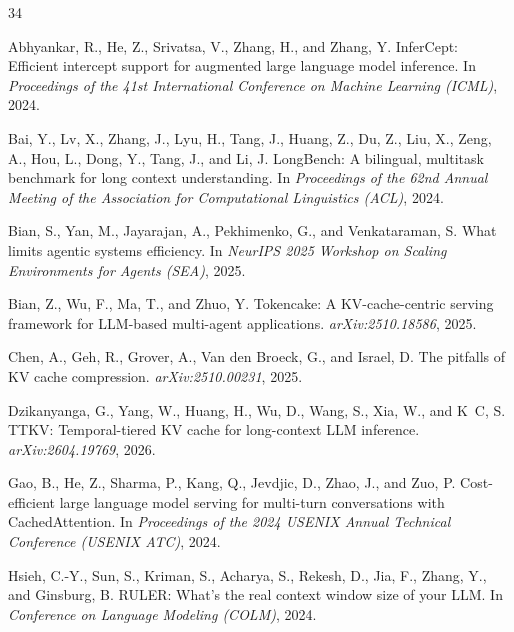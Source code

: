 \documentclass{article}
\begin{document}
\begin{thebibliography}{34}

Abhyankar, R., He, Z., Srivatsa, V., Zhang, H., and Zhang, Y.
\newblock InferCept: Efficient intercept support for augmented large
  language model inference.
\newblock In \emph{Proceedings of the 41st International Conference on
  Machine Learning (ICML)}, 2024.

Bai, Y., Lv, X., Zhang, J., Lyu, H., Tang, J., Huang, Z., Du, Z.,
  Liu, X., Zeng, A., Hou, L., Dong, Y., Tang, J., and Li, J.
\newblock LongBench: A bilingual, multitask benchmark for long context
  understanding.
\newblock In \emph{Proceedings of the 62nd Annual Meeting of the
  Association for Computational Linguistics (ACL)}, 2024.

Bian, S., Yan, M., Jayarajan, A., Pekhimenko, G., and Venkataraman, S.
\newblock What limits agentic systems efficiency.
\newblock In \emph{NeurIPS 2025 Workshop on Scaling Environments for
  Agents (SEA)}, 2025.

Bian, Z., Wu, F., Ma, T., and Zhuo, Y.
\newblock Tokencake: A KV-cache-centric serving framework for
  LLM-based multi-agent applications.
\newblock \emph{arXiv:2510.18586}, 2025.

Chen, A., Geh, R., Grover, A., Van den Broeck, G., and Israel, D.
\newblock The pitfalls of KV cache compression.
\newblock \emph{arXiv:2510.00231}, 2025.

Dzikanyanga, G., Yang, W., Huang, H., Wu, D., Wang, S., Xia, W., and
  K~C, S.
\newblock TTKV: Temporal-tiered KV cache for long-context LLM inference.
\newblock \emph{arXiv:2604.19769}, 2026.

Gao, B., He, Z., Sharma, P., Kang, Q., Jevdjic, D., Zhao, J., and
  Zuo, P.
\newblock Cost-efficient large language model serving for multi-turn
  conversations with CachedAttention.
\newblock In \emph{Proceedings of the 2024 USENIX Annual Technical
  Conference (USENIX ATC)}, 2024.

Hsieh, C.-Y., Sun, S., Kriman, S., Acharya, S., Rekesh, D., Jia, F.,
  Zhang, Y., and Ginsburg, B.
\newblock RULER: What's the real context window size of your LLM.
\newblock In \emph{Conference on Language Modeling (COLM)}, 2024.


\end{thebibliography}
\end{document}
